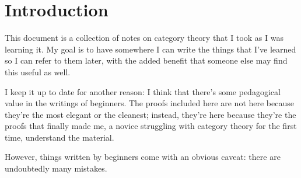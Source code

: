 \documentclass[main.tex]{subfiles}
\begin{document}
\chapter{Introduction}
\label{ch:introduction}

This document is a collection of notes on category theory that I took as I was learning it. My goal is to have somewhere I can write the things that I've learned so I can refer to them later, with the added benefit that someone else may find this useful as well.

I keep it up to date for another reason: I think that there's some pedagogical value in the writings of beginners. The proofs included here are not here because they're the most elegant or the cleanest; instead, they're here because they're the proofs that finally made me, a novice struggling with category theory for the first time, understand the material.

However, things written by beginners come with an obvious caveat: there are undoubtedly many mistakes.
\end{document}
